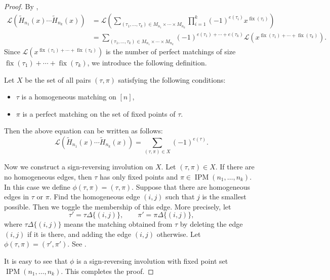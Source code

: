\documentclass[oneside]{book}
\numberwithin{equation}{section}
\theoremstyle{definition}
\newcommand\IPM{\operatorname{IPM}}
\newcommand\fix{\operatorname{fix}}
\newcommand\LL{\mathcal{L}}
\begin{document}
\begin{proof}
  By ,
  \begin{align*}
    \LL \left( \widetilde{H}_{n_1}(x)\cdots \widetilde{H}_{n_k}(x) \right)
    & =  \LL\left( \sum_{(\tau_1,\dots,\tau_k)\in M_{n_1} \times \cdots \times M_{n_k}}
      \prod_{i=1}^{k} (-1)^{e(\tau_i)} x^{\fix(\tau_i)} \right)\\
    & =   \sum_{(\tau_1,\dots,\tau_k)\in M_{n_1} \times \cdots \times M_{n_k}}
        (-1)^{e(\tau_1) + \cdots + e(\tau_k)} 
     \LL \left( x^{\fix(\tau_1) + \cdots + \fix(\tau_k)} \right).
\end{align*}
Since \( \LL \left( x^{\fix(\tau_1) + \cdots + \fix(\tau_k)} \right) \)
is the number of perfect matchings of size
\( \fix(\tau_1) + \cdots + \fix(\tau_k) \), we introduce the following
definition.

Let \( X \) be the set of all pairs \( (\tau,\pi) \) satisfying the
following conditions:
\begin{itemize}
\item \( \tau \) is a homogeneous matching on \( [n] \),
\item \( \pi \) is a perfect matching on the set of fixed points of \( \tau \).
\end{itemize}
Then the above equation can be written as follows:
\[
    \LL \left( \widetilde{H}_{n_1}(x)\cdots \widetilde{H}_{n_k}(x) \right)
     =   \sum_{(\tau,\pi)\in X} (-1)^{e(\tau)}.
\]

Now we construct a sign-reversing involution on \( X \). Let
\( (\tau,\pi)\in X \). If there are no homogeneous edges, then
\( \tau \) has only fixed points and \( \pi\in \IPM(n_1,\dots,n_k) \).
In this case we define \( \phi(\tau,\pi) = (\tau,\pi) \). Suppose that
there are homogeneous edges in \( \tau \) or \( \pi \). Find the
homogeneous edge \( (i,j) \) such that \( j \) is the smallest
possible. Then we toggle the membership of this edge. More precisely,
let
\[
  \tau' = \tau \Delta \{(i,j)\}, \qquad 
  \pi' = \pi \Delta \{(i,j)\}, 
\]
where \( \tau\Delta\{(i,j)\} \) means the matching obtained from
\( \tau \) by deleting the edge \( (i,j) \) if it is there, and adding
the edge \( (i,j) \) otherwise. Let
\( \phi(\tau,\pi) = (\tau',\pi') \). See .

It is easy to see that \( \phi \) is a sign-reversing involution with
fixed point set \( \IPM(n_1,\dots,n_k) \). This completes the proof.
\end{proof}
\end{document}
